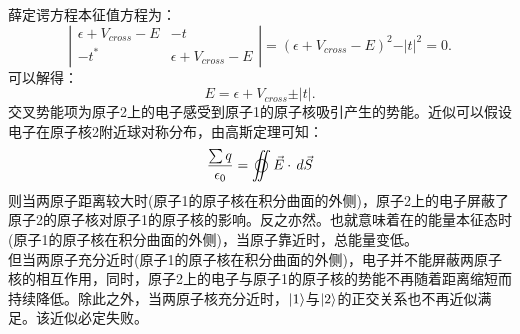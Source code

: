 \documentclass[reqno,a4paper,12pt]{amsart}
\begin{document}
\begin{enumerate}[(a)]
\begin{tcolorbox}[breakable, colback = black!5!white, colframe = black]
%		
	薛定谔方程本征值方程为：
	\[
	\left\vert\begin{matrix}
		\epsilon + V_{cross} - E & -t \\
		-t^* & \epsilon + V_{cross} - E
	\end{matrix}\right\vert = (\epsilon + V_{cross} - E)^2 - \vert t \vert^2 = 0.
	\]
	可以解得：
	\[
		E = \epsilon + V_{cross} \pm \vert t \vert.
	\]
	交叉势能项为原子2上的电子感受到原子1的原子核吸引产生的势能。近似可以假设电子在原子核2附近球对称分布，由高斯定理可知：
	\[
		\frac{\sum q}{\epsilon_0} = \varoiint \vec{E} \cdot \,d\vec{S}
	\]
	则当两原子距离较大时(原子1的原子核在积分曲面的外侧)，原子2上的电子屏蔽了原子2的原子核对原子1的原子核的影响。反之亦然。也就意味着在的能量本征态时(原子1的原子核在积分曲面的外侧)，当原子靠近时，总能量变低。 \\
	但当两原子充分近时(原子1的原子核在积分曲面的外侧)，电子并不能屏蔽两原子核的相互作用，同时，原子2上的电子与原子1的原子核的势能不再随着距离缩短而持续降低。除此之外，当两原子核充分近时，$\ket{1}$与$\ket{2}$的正交关系也不再近似满足。该近似必定失败。
	\end{tcolorbox}
\end{enumerate}
\end{document}
